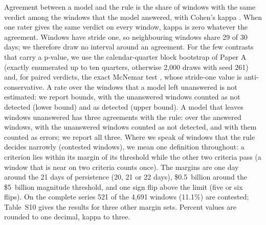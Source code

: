 Agreement between a model and the rule is the share of windows with the same verdict among the windows that the model answered, with Cohen's kappa \cite{cohen1960coefficient}. When one rater gives the same verdict on every window, kappa is zero whatever the agreement. Windows have stride one, so neighbouring windows share 29 of 30 days; we therefore draw no interval around an agreement. For the few contrasts that carry a p-value, we use the calendar-quarter block bootstrap \cite{kunsch1989jackknife} of Paper A (exactly enumerated up to ten quarters, otherwise 2{,}000 draws with seed 261) and, for paired verdicts, the exact McNemar test \cite{mcnemar1947note}, whose stride-one value is anti-conservative. A rate over the windows that a model left unanswered is not estimated: we report bounds, with the unanswered windows counted as not detected (lower bound) and as detected (upper bound). A model that leaves windows unanswered has three agreements with the rule: over the answered windows, with the unanswered windows counted as not detected, and with them counted as errors; we report all three. Where we speak of windows that the rule decides narrowly (contested windows), we mean one definition throughout: a criterion lies within its margin of its threshold while the other two criteria pass (a window that is near on two criteria counts once). The margins are one day around the 21 days of persistence (20, 21 or 22 days), \$0.5~billion around the \$5~billion magnitude threshold, and one sign flip above the limit (five or six flips). On the complete series 521 of the 4{,}691 windows (11.1\%) are contested; Table~S10 gives the results for three other margin sets. Percent values are rounded to one decimal, kappa to three.
